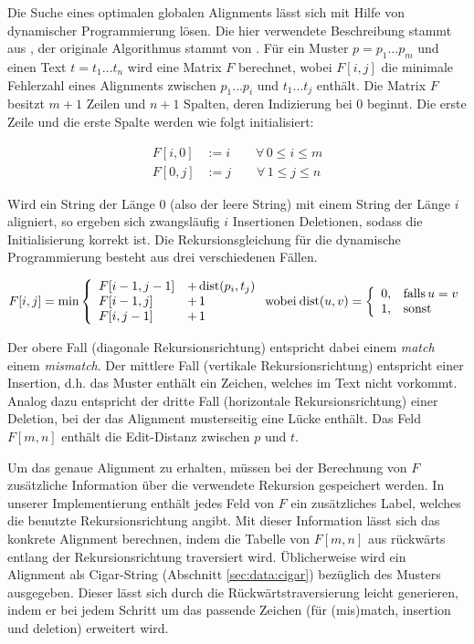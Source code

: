 Die Suche eines optimalen globalen Alignments lässt sich mit Hilfe von dynamischer Programmierung lösen. Die hier verwendete Beschreibung stammt aus \citep{Rahmann2013}, der originale Algorithmus stammt von \citet{Needleman1970}. Für ein Muster $p = p_1 \ldots p_m$ und einen Text $t = t_1 \ldots t_n$ wird eine Matrix $F$ berechnet, wobei $F[i,j]$ die minimale Fehlerzahl eines Alignments zwischen $p_1 \ldots p_i$ und $t_1 \ldots t_j$ enthält. Die Matrix $F$ besitzt $m+1$ Zeilen und $n+1$ Spalten, deren Indizierung bei $0$ beginnt. Die erste Zeile und die erste Spalte werden wie folgt initialisiert:

\begin{align*}
F[i,0] &:= i \qquad \forall \, 0 \leq i \leq m \\
F[0,j] &:= j \qquad \forall \, 1 \leq j \leq n
\end{align*}

Wird ein String der Länge $0$ (also der leere String) mit einem String der Länge $i$ aligniert, so ergeben sich zwangsläufig $i$ Insertionen \bzw Deletionen, sodass die Initialisierung korrekt ist. Die Rekursionsgleichung für die dynamische Programmierung besteht aus drei verschiedenen Fällen. 

\[
F[i,j] = \min \left\{\begin{array}{ll} F[i-1,j-1] &+ \, \text{dist}(p_i,t_j)\\ F[i-1,j] &+ \, 1 \\ F[i,j-1] &+ \, 1 \end{array}\right. \mbox{wobei} \: \text{dist}(u,v) = \left\{\begin{array}{cl} 0, & \mbox{falls} \, u = v\\ 1, & \mbox{sonst} \end{array}\right.
\]

Der obere Fall (diagonale Rekursionsrichtung) entspricht dabei einem \textit{match} \bzw einem \textit{mismatch}. Der mittlere Fall (vertikale Rekursionsrichtung) entspricht einer Insertion, d.h. das Muster enthält ein Zeichen, welches im Text nicht vorkommt. Analog dazu entspricht der dritte Fall (horizontale Rekursionsrichtung) einer Deletion, bei der das Alignment musterseitig eine Lücke enthält. Das Feld $F[m,n]$ enthält die Edit-Distanz zwischen $p$ und $t$. 

Um das genaue Alignment zu erhalten, müssen bei der Berechnung von $F$ zusätzliche Information über die verwendete Rekursion gespeichert werden. In unserer Implementierung enthält jedes Feld von $F$ ein zusätzliches Label, welches die benutzte Rekursionsrichtung angibt. Mit dieser Information lässt sich das konkrete Alignment berechnen, indem die Tabelle von $F[m,n]$ aus rückwärts entlang der Rekursionsrichtung traversiert wird. Üblicherweise wird ein Alignment als Cigar-String (\vgl Abschnitt \ref{sec:data:cigar}) bezüglich des Musters ausgegeben. Dieser lässt sich durch die Rückwärtstraversierung leicht generieren, indem er bei jedem Schritt um das passende Zeichen (für (mis)match, insertion und deletion) erweitert wird.

